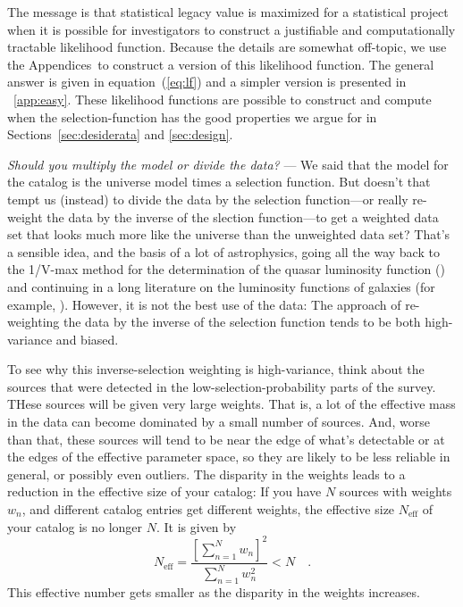 \documentclass[modern]{aastex62}
\newcommand{\sectionname}{Section}
\newcommand{\appendixnames}{Appendices}
\newcommand{\equationname}{equation}
\renewcommand{\paragraph}[1]{\medskip\noindent\textit{#1} ---}
\begin{document}
The message is that statistical legacy value is maximized for a
statistical project when it is possible for investigators to construct
a justifiable and computationally tractable likelihood function.
Because the details are somewhat off-topic, we use the
\appendixnames\ to construct a version of this likelihood function.
The general
answer is given in \equationname~(\ref{eq:lf}) and a simpler version
is presented in \appendixname~\ref{app:easy}.
These likelihood functions are possible to construct and compute when the
selection-function has the good properties we argue for in
\sectionname s~\ref{sec:desiderata} and \ref{sec:design}.

\paragraph{Should you multiply the model or divide the data?}
We said that the model for the catalog is the universe model times a
selection function.
But doesn't that tempt us (instead) to divide the data by the selection
function---or really re-weight the data by the inverse of the slection
function---to get a weighted data set that looks much more like the
universe than the unweighted data set?
That's a sensible idea, and the basis of a lot of astrophysics, going
all the way back to the 1/V-max method for the determination of the quasar
luminosity function (\citealt{schmidt}) and continuing in a long literature on the
luminosity functions of galaxies (for example, \citealt{cowie, blanton, faber}).
However, it is not the best use of the data:
The approach of re-weighting the data by the inverse of the
selection function tends to be both high-variance and biased.

To see why this inverse-selection weighting is high-variance, think about
the sources that were detected in the low-selection-probability parts of
the survey.
THese sources will be given very large weights.
That is, a lot of the effective mass in the data can become dominated by
a small number of sources.
And, worse than that, these sources will tend to be near the edge of
what's detectable or at the edges of the effective parameter space, so
they are likely to be less reliable in general, or possibly even outliers.
The disparity in the weights leads to a reduction in the effective size
of your catalog:
If you have $N$ sources with weights $w_n$, and different catalog entries get
different weights, the effective size $N_\mathrm{eff}$ of your catalog
is no longer $N$.
It is given by
\begin{equation}
N_\mathrm{eff} = \frac{\left[\sum_{n=1}^N w_n\right]^2}{\sum_{n=1}^N w_n^2} < N \quad .
\end{equation}
This effective number gets smaller as the disparity in the weights increases.
\end{document}
